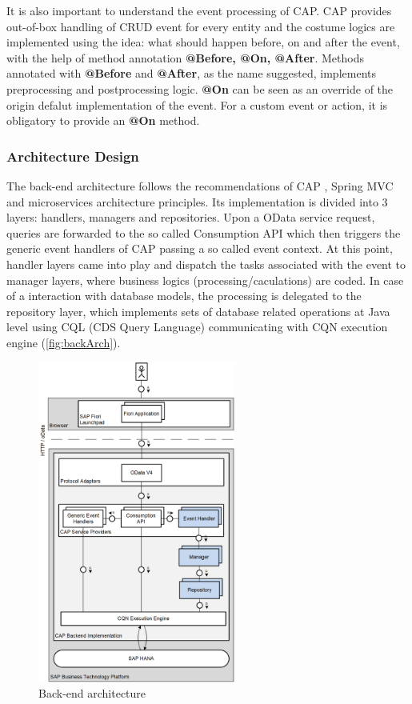 \bigskip
It is also important to understand the event processing of CAP. CAP provides out-of-box handling of CRUD event for every entity and the costume logics are implemented using the idea: what should happen before, on and after the event, with the help of method annotation \textbf{@Before, @On, @After}. Methods annotated with \textbf{@Before} and \textbf{@After}, as the name suggested, implements preprocessing and postprocessing logic. \textbf{@On} can be seen as an override of the origin defalut implementation of the event. For a custom event or action, it is obligatory to provide an \textbf{@On} method.

\subsubsection{Architecture Design}
\label{subsubsec:D-srv-design}

The back-end architecture follows the recommendations of CAP \cite{cap-java-architecture}, Spring MVC \cite{spring-mvc} and microservices architecture principles. Its implementation is divided into 3 layers: handlers, managers and repositories. Upon a OData service request, queries are forwarded to the so called Consumption API which then triggers the generic event handlers of CAP passing a so called event context. At this point, handler layers came into play and dispatch the tasks associated with the event to manager layers, where business logics (processing/caculations) are coded. In case of a interaction with database models, the processing is delegated to the repository layer, which implements sets of database related operations at Java level using CQL (CDS Query Language) \cite{cap-cds-cql} communicating with CQN execution engine (\autoref{fig:backArch}). 

\begin{figure}[H]
	\centering
	\includegraphics[height=400px]{images/backend_architecture.png}
	\caption{Back-end architecture}
	\label{fig:backArch}
\end{figure}

